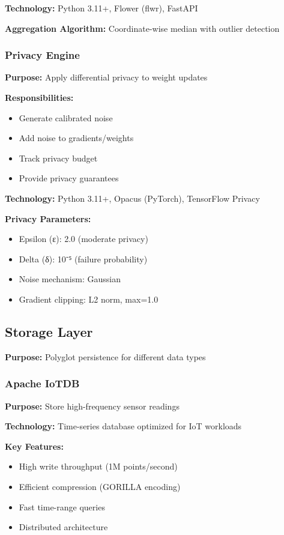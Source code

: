 \documentclass[12pt,a4paper]{article}
\begin{document}
\textbf{Technology:} Python 3.11+, Flower (flwr), FastAPI

\textbf{Aggregation Algorithm:} Coordinate-wise median with outlier detection


\subsubsection{Privacy Engine}

\textbf{Purpose:} Apply differential privacy to weight updates

\textbf{Responsibilities:}
\begin{itemize}[leftmargin=1cm,itemsep=0pt]
    \item Generate calibrated noise
    \item Add noise to gradients/weights
    \item Track privacy budget
    \item Provide privacy guarantees
\end{itemize}

\textbf{Technology:} Python 3.11+, Opacus (PyTorch), TensorFlow Privacy

\textbf{Privacy Parameters:}
\begin{itemize}[leftmargin=1cm,itemsep=0pt]
    \item Epsilon (ε): 2.0 (moderate privacy)
    \item Delta (δ): 10⁻⁵ (failure probability)
    \item Noise mechanism: Gaussian
    \item Gradient clipping: L2 norm, max=1.0
\end{itemize}

\subsection{Storage Layer}

\textbf{Purpose:} Polyglot persistence for different data types

\subsubsection{Apache IoTDB}

\textbf{Purpose:} Store high-frequency sensor readings

\textbf{Technology:} Time-series database optimized for IoT workloads

\textbf{Key Features:}
\begin{itemize}[leftmargin=1cm,itemsep=0pt]
    \item High write throughput (1M points/second)
    \item Efficient compression (GORILLA encoding)
    \item Fast time-range queries
    \item Distributed architecture
\end{itemize}
\end{document}
